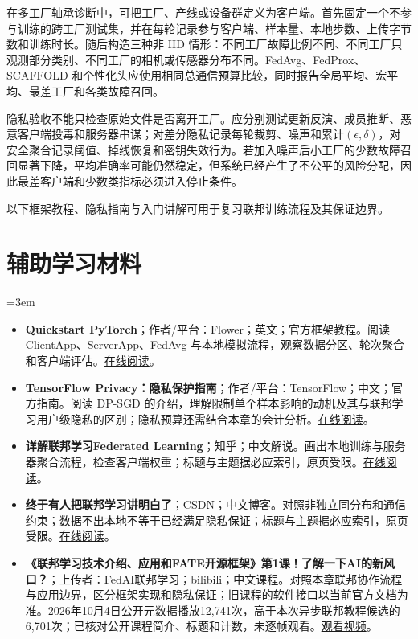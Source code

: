 在多工厂轴承诊断中，可把工厂、产线或设备群定义为客户端。首先固定一个不参与训练的跨工厂测试集，并在每轮记录参与客户端、样本量、本地步数、上传字节数和训练时长。随后构造三种非 IID 情形：不同工厂故障比例不同、不同工厂只观测部分类别、不同工厂的相机或传感器分布不同。FedAvg、FedProx、SCAFFOLD 和个性化头应使用相同总通信预算比较，同时报告全局平均、宏平均、最差工厂和各类故障召回。

隐私验收不能只检查原始文件是否离开工厂。应分别测试更新反演、成员推断、恶意客户端投毒和服务器串谋；对差分隐私记录每轮裁剪、噪声和累计$(\epsilon,\delta)$，对安全聚合记录阈值、掉线恢复和密钥失效行为。若加入噪声后小工厂的少数故障召回显著下降，平均准确率可能仍然稳定，但系统已经产生了不公平的风险分配，因此最差客户端和少数类指标必须进入停止条件。

以下框架教程、隐私指南与入门讲解可用于复习联邦训练流程及其保证边界。
\section*{辅助学习材料}
\begingroup
\emergencystretch=3em
\begin{itemize}
\item \textbf{Quickstart PyTorch}；作者/平台：Flower；英文；官方框架教程。阅读 ClientApp、ServerApp、FedAvg 与本地模拟流程，观察数据分区、轮次聚合和客户端评估。\href{https://flower.ai/docs/framework/tutorial-quickstart-pytorch.html}{在线阅读}。
\item \textbf{TensorFlow Privacy：隐私保护指南}；作者/平台：TensorFlow；中文；官方指南。阅读 DP-SGD 的介绍，理解限制单个样本影响的动机及其与联邦学习用户级隐私的区别；隐私预算还需结合本章的会计分析。\href{https://tensorflow.google.cn/responsible\_ai/privacy}{在线阅读}。
\item \textbf{详解联邦学习Federated Learning}；知乎；中文解说。画出本地训练与服务器聚合流程，检查客户端权重；标题与主题据必应索引，原页受限。\href{https://zhuanlan.zhihu.com/p/79284686}{在线阅读}。
\item \textbf{终于有人把联邦学习讲明白了}；CSDN；中文博客。对照非独立同分布和通信约束；数据不出本地不等于已经满足隐私保证；标题与主题据必应索引，原页受限。\href{https://blog.csdn.net/hzbooks/article/details/118097998}{在线阅读}。
\item \textbf{《联邦学习技术介绍、应用和FATE开源框架》第1课！了解一下AI的新风口？}；上传者：FedAI联邦学习；bilibili；中文课程。对照本章联邦协作流程与应用边界，区分框架实现和隐私保证；旧课程的软件接口以当前官方文档为准。2026年10月4日公开元数据播放12,741次，高于本次异步联邦教程候选的6,701次；已核对公开课程简介、标题和计数，未逐帧观看。\href{https://www.bilibili.com/video/BV1JE411p72s/}{观看视频}。
\end{itemize}
\endgroup
